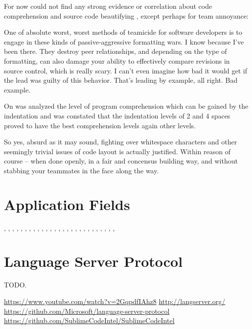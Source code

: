     For now could not find any strong evidence or correlation about code
    comprehension and source code beautifying \cite{improvingCodeReadability},
    except perhaps for team annoyance:

    \begin{citacao}
    One of absolute worst, worst methods of teamicide for software developers is to engage
    in these kinds of passive-aggressive formatting wars. I know because I've been there.
    They destroy peer relationships, and depending on the type of formatting, can also damage
    your ability to effectively compare revisions in source control, which is really scary.
    I can't even imagine how bad it would get if the lead was guilty of this behavior. That's
    leading by example, all right. Bad example. \cite{Atwood}
    \end{citacao}

    On  was analyzed the level of program
    comprehension which can be gained by the indentation and was constated that
    the indentation levels of 2 and 4 spaces proved to have the best
    comprehension levels again other levels.

    \begin{citacao}
    So yes, absurd as it may sound, fighting over whitespace characters and other seemingly
    trivial issues of code layout is actually justified. Within reason of course -- when done
    openly, in a fair and concensus building way, and without stabbing your teammates in the
    face along the way. \cite{Atwood}
    \end{citacao}



    \section{Application Fields}

    ,
    ,
    ,
    ,
    ,
    ,
    ,
    ,
    ,
    ,
    ,
    ,
    ,
    ,
    ,
    ,
    ,
    ,
    ,
    ,
    ,
    ,
    ,
    ,
    ,
    ,
    ,


    \section{Language Server Protocol}

    TODO.

    \url{https://www.youtube.com/watch?v=2GqpdfIAhz8}
    \url{http://langserver.org/}
    \url{https://github.com/Microsoft/language-server-protocol}
    \url{https://github.com/SublimeCodeIntel/SublimeCodeIntel}


